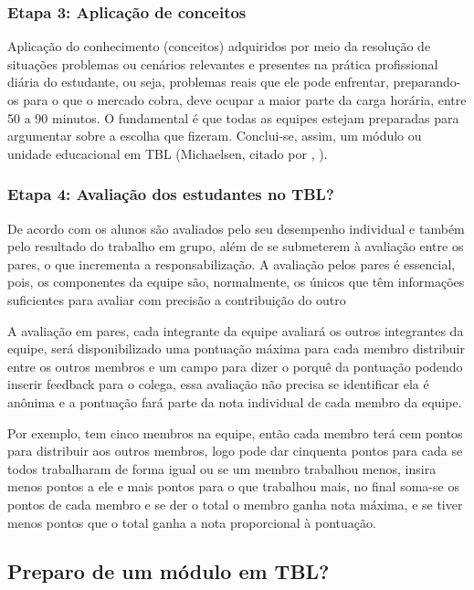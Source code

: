 \subsubsection{Etapa 3: Aplicação de conceitos}

Aplicação do conhecimento (conceitos) adquiridos por meio da resolução de situações problemas ou cenários relevantes e presentes na prática profissional diária do estudante, ou seja, problemas reais que ele pode enfrentar, preparando-os para o que o mercado cobra, deve ocupar a maior parte da carga horária, entre 50 a 90 minutos. O fundamental é que todas as equipes estejam preparadas para argumentar sobre a escolha que fizeram. Conclui-se, assim, um módulo ou unidade educacional em TBL (Michaelsen, citado por \citeauthor{bollela}, \citeyear{bollela}).

\subsubsection{Etapa 4: Avaliação dos estudantes no TBL?}

De acordo com \cite{bollela} os alunos são avaliados pelo seu desempenho individual e também pelo resultado do trabalho em grupo, além de se submeterem à avaliação entre os pares, o que incrementa a responsabilização. A avaliação pelos pares é essencial, pois, os componentes da equipe são, normalmente, os únicos que têm informações suficientes para avaliar com precisão a contribuição do outro

A avaliação em pares, cada integrante da equipe avaliará os outros integrantes da equipe, será disponibilizado uma pontuação máxima para cada membro distribuir entre os outros membros e um campo para dizer o porquê da pontuação podendo inserir feedback para o colega, essa avaliação não precisa se identificar ela é anônima e a pontuação fará parte da nota individual de cada membro da equipe.

Por exemplo, tem cinco membros na equipe, então cada membro terá cem pontos para distribuir aos outros membros, logo pode dar cinquenta pontos para cada se todos trabalharam de forma igual ou se um membro trabalhou menos, insira menos pontos a ele e mais pontos para o que trabalhou mais, no final soma-se os pontos de cada membro e se der o total o membro ganha nota máxima, e se tiver menos pontos que o total ganha a nota proporcional à pontuação.

\subsection{Preparo de um módulo em TBL?}

